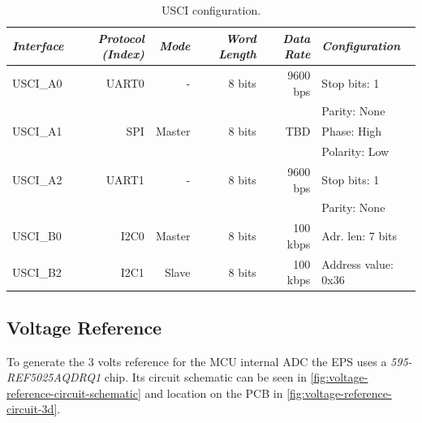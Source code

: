 \begin{table}[!h]
    \centering
    \begin{tabular}{lrrrrl}
        \toprule[1.5pt]
        \textit{Interface} & \textit{Protocol (Index)} & \textit{Mode} & \textit{Word Length} & \textit{Data Rate} & \textit{Configuration} \\
        \midrule
        USCI\_A0           & UART0                     & -             & 8 bits               & 9600 bps           & Stop bits: 1 \\
                           &                           &               &                      &                    & Parity: None \\
        USCI\_A1           & SPI                       & Master        & 8 bits               & TBD                & Phase: High \\
                           &                           &               &                      &                    & Polarity: Low \\
        USCI\_A2           & UART1                     & -             & 8 bits               & 9600 bps           & Stop bits: 1 \\
                           &                           &               &                      &                    & Parity: None \\
        USCI\_B0           & I2C0                      & Master        & 8 bits               & 100 kbps           & Adr. len: 7 bits \\
        USCI\_B2           & I2C1                      & Slave         & 8 bits               & 100 kbps           & Address value: 0x36 \\
        \bottomrule[1.5pt]
    \end{tabular}
    \caption{USCI configuration.}
    \label{tab:usci-config}
\end{table}

\subsection{Voltage Reference}

To generate the 3 volts reference for the MCU internal ADC the EPS uses a \textit{595-REF5025AQDRQ1} chip.
Its circuit schematic can be seen in \autoref{fig:voltage-reference-circuit-schematic} and location on the PCB in \autoref{fig:voltage-reference-circuit-3d}.

